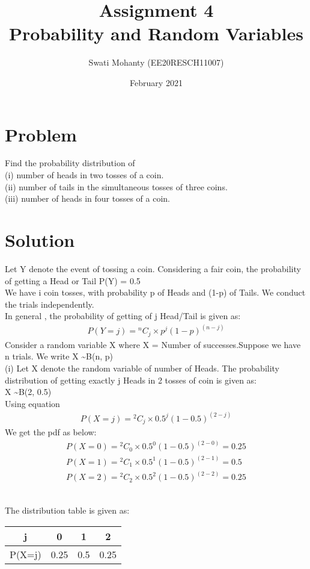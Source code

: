 \documentclass[journal,12pt,twocolumn]{IEEEtran}
\title{Assignment 4
\\Probability and Random Variables }
\author{Swati Mohanty (EE20RESCH11007) }
\date{February 2021}
\newcommand*{\Comb}[2]{{}^{#1}C_{#2}}%
\begin{document}
\maketitle


\section{Problem}
Find the probability distribution of
\\(i) number of heads in two tosses of a coin.
\\(ii) number of tails in the simultaneous tosses
of three coins.
\\(iii) number of heads in four tosses of a coin.

\section{Solution}
Let Y denote the event of tossing a coin. Considering a fair coin, the probability of getting a Head or Tail P(Y) = 0.5
\\We have i coin tosses, with probability p of Heads and (1-p) of Tails. We
conduct the trials independently. 
\\In general , the probability of getting of j Head/Tail is given as:
\begin{align}
    P(Y = j) = \Comb{n}{j}\times { p^j (1-p)^{(n-j)}}
\end{align}
Consider a random variable X where X = Number of successes.Suppose we have n trials. We write
X \textasciitilde B(n, p) 
\\(i)
Let X denote the random variable of number of Heads.
The probability distribution of getting exactly j Heads in 2 tosses of coin is given as:
\\X \textasciitilde B(2, 0.5) 
\\Using equation 
\begin{align}
    P(X = j) = \Comb{2}{j}\times { 0.5^j (1-0.5)^{(2-j)}}
\end{align}
We get the pdf as below:
\begin{align}
    P(X=0) =\Comb{2}{0}\times { 0.5^0 (1-0.5)^{(2-0)}}
    =0.25
    \\P(X=1) = \Comb{2}{1}\times { 0.5^1 (1-0.5)^{(2-1)}} = 0.5
    \\P(X=2) = \Comb{2}{2}\times { 0.5^2 (1-0.5)^{(2-2)}} = 0.25
\end{align}

\\The distribution table is given as:
\begin{center}
\begin{tabular}{ |c|c|c|c| } 
 \hline
 j & 0 & 1 & 2 \\\hline 
 P(X=j) & 0.25 &0.5 & 0.25 \\ 
 \hline
\end{tabular}
\end{center}
\end{document}
